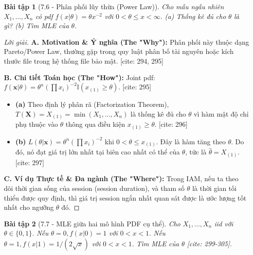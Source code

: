 \documentclass[8pt,a4paper]{article}
\newtheorem{exercise}{Bài tập}
\newenvironment{solution}{\begin{proof}[Lời giải]}{\end{proof}}
\begin{document}
\begin{exercise}[7.6 - Phân phối lũy thừa (Power Law)]
Cho mẫu ngẫu nhiên $X_1, \dots, X_n$ có pdf $f(x|\theta) = \theta x^{-2}$ với $0 < \theta \le x < \infty$.
(a) Thống kê đủ cho $\theta$ là gì? (b) Tìm MLE của $\theta$.
\end{exercise}

\begin{solution}
\textbf{A. Motivation \& Ý nghĩa (The "Why"):} Phân phối này thuộc dạng Pareto/Power Law, thường gặp trong quy luật phân bố tài nguyên hoặc kích thước file trong hệ thống file bảo mật. [cite: 294, 295]

\textbf{B. Chi tiết Toán học (The "How"):}
Joint pdf: $f(\mathbf{x}|\theta) = \theta^n (\prod x_i)^{-2} \mathbb{I}(x_{(1)} \ge \theta)$. [cite: 295]
\begin{itemize}
    \item \textbf{(a)} Theo định lý phân rã (Factorization Theorem), $T(\mathbf{X}) = X_{(1)} = \min(X_1, \dots, X_n)$ là thống kê đủ cho $\theta$ vì hàm mật độ chỉ phụ thuộc vào $\theta$ thông qua điều kiện $x_{(1)} \ge \theta$. [cite: 296]
    \item \textbf{(b)} $L(\theta | \mathbf{x}) = \theta^n (\prod x_i)^{-2}$ khi $0 < \theta \le x_{(1)}$. Đây là hàm tăng theo $\theta$. Do đó, nó đạt giá trị lớn nhất tại biên cao nhất có thể của $\theta$, tức là $\hat{\theta} = X_{(1)}$. [cite: 297]
\end{itemize}

\textbf{C. Ví dụ Thực tế \& Đa ngành (The "Where"):} Trong IAM, nếu ta theo dõi thời gian sống của session (session duration), và tham số $\theta$ là thời gian tối thiểu được quy định, thì giá trị session ngắn nhất quan sát được là ước lượng tốt nhất cho ngưỡng $\theta$ đó.
\end{solution}


\begin{exercise}[7.7 - MLE giữa hai mô hình PDF cụ thể]
Cho $X_1, \dots, X_n$ iid với $\theta \in \{0, 1\}$. Nếu $\theta=0, f(x|0)=1$ với $0<x<1$. Nếu $\theta=1, f(x|1)=1/(2\sqrt{x})$ với $0<x<1$. Tìm MLE của $\theta$ [cite: 299-305].
\end{exercise}
\end{document}
